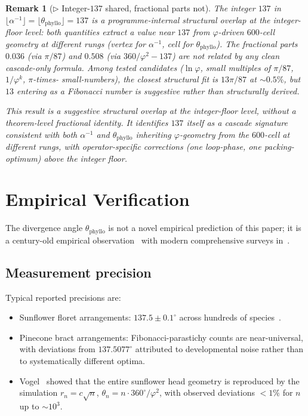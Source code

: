 \documentclass[12pt]{article}
\newtheorem{remark}[theorem]{Remark}
\newcommand{\phig}{\varphi}
\begin{document}
\begin{remark}[$\triangleright$ Integer-$137$ shared, fractional parts not]\label{rem:R1}
The integer $137$ in $\lfloor\alpha^{-1}\rfloor = \lfloor
\theta_{\mathrm{phyllo}} \rfloor = 137$ is a programme-internal
structural overlap at the integer-floor level: both quantities
extract a
value near $137$ from $\phig$-driven $600$-cell geometry at
different rungs (vertex for $\alpha^{-1}$, cell for
$\theta_{\mathrm{phyllo}}$). The fractional parts $0.036$ (via
$\pi/87$) and $0.508$ (via $360/\phig^2 - 137$) are \emph{not}
related by any clean cascade-only formula. Among tested candidates
($\ln\phig$, small multiples of $\pi/87$, $1/\phig^k$, $\pi$-times-
small-numbers), the closest structural fit is $13\pi/87$ at
$\sim 0.5\%$, but $13$ entering as a Fibonacci number is suggestive
rather than structurally derived.

This result is a \emph{suggestive structural overlap at the
integer-floor level}, without a theorem-level fractional identity.
It identifies $137$ itself as a cascade signature consistent with
both $\alpha^{-1}$ and $\theta_{\mathrm{phyllo}}$ inheriting
$\phig$-geometry from the $600$-cell at different rungs, with
operator-specific corrections (one loop-phase, one packing-
optimum) above the integer floor.
\end{remark}

\section{Empirical Verification}\label{sec:empirical}

The divergence angle $\theta_{\mathrm{phyllo}}$ is not a novel
empirical prediction of this paper; it is a century-old empirical
observation~\cite{AiryPhyllotaxis,SchwendenerPhyllotaxis,AdlerBarabe}
with modern comprehensive surveys in~\cite{Jean1994}.

\subsection{Measurement precision}

Typical reported precisions are:
\begin{itemize}
\item Sunflower floret arrangements: $137.5 \pm 0.1^{\circ}$ across
  hundreds of species~\cite{Jean1994}.
\item Pinecone bract arrangements: Fibonacci-parastichy counts are
  near-universal, with deviations from $137.5077^{\circ}$ attributed
  to developmental noise rather than to systematically different
  optima.
\item Vogel~\cite{Vogel1979} showed that the entire sunflower head
  geometry is reproduced by the simulation
  $r_n = c\sqrt{n}$, $\theta_n = n\cdot 360^{\circ}/\phig^2$, with
  observed deviations $< 1\%$ for $n$ up to $\sim 10^3$.
\end{itemize}
\end{document}
